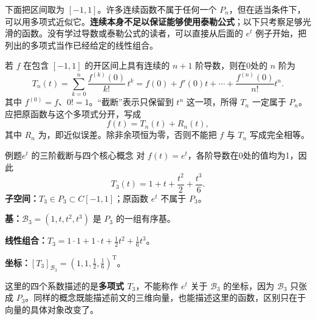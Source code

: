 \documentclass[a4paper,12pt,twoside,openany,fontset=none]{ctexbook}
\let\oldsum\sum
\renewcommand{\sum}{\displaystyle\oldsum}
\newcounter{example}[chapter]
\newenvironment{example}[1][]{\begin{exBox}{例题}{#1}}{\end{exBox}}
\numberwithin{equation}{chapter}
\begin{document}
下面把区间取为 $[-1,1]$。许多连续函数不属于任何一个 $P_n$，但在适当条件下，可以用多项式近似它。\textbf{连续本身不足以保证能够使用泰勒公式}；以下只考察足够光滑的函数。没有学过导数或泰勒公式的读者，可以直接从后面的 $e^t$ 例子开始，把列出的多项式当作已经给定的线性组合。

若 $f$ 在包含 $[-1,1]$ 的开区间上具有连续的 $n+1$ 阶导数，则在0处的 $n$ 阶为
\[
    T_n(t)=\sum_{k=0}^{n}\frac{f^{(k)}(0)}{k!}\,t^k
    =f(0)+f'(0)t+\cdots+\frac{f^{(n)}(0)}{n!}t^n.
\]
其中 $f^{(0)}=f$、$0!=1$。“截断”表示只保留到 $t^n$ 这一项，所得 $T_n$ 一定属于 $P_n$。应把原函数与这个多项式分开，写成
\[
    f(t)=T_n(t)+R_n(t),
\]
其中 $R_n$ 为，即近似误差。除非余项恒为零，否则不能把 $f$ 与 $T_n$ 写成完全相等。

\begin{example}[$e^t$ 的三阶截断与四个核心概念]
对 $f(t)=e^t$，各阶导数在0处的值均为1，因此
\[
    T_3(t)=1+t+\frac{t^2}{2}+\frac{t^3}{6}.
\]
\textbf{子空间：}$T_3\in P_3\subset C[-1,1]$；原函数 $e^t$ 不属于 $P_3$。

\textbf{基：}$\mathcal{B}_3=(1,t,t^2,t^3)$ 是 $P_3$ 的一组有序基。

\textbf{线性组合：}$T_3=1\cdot1+1\cdot t+\tfrac12 t^2+\tfrac16 t^3$。

\textbf{坐标：}$[T_3]_{\mathcal{B}_3}=(1,1,\tfrac12,\tfrac16)^{\mathrm T}$。
\end{example}

这里的四个系数描述的是\textbf{多项式 $T_3$}，不能称作 $e^t$ 关于 $\mathcal{B}_3$ 的坐标，因为 $\mathcal{B}_3$ 只张成 $P_3$。同样的概念既能描述前文的三维向量，也能描述这里的函数，区别只在于向量的具体对象改变了。

\end{document}
